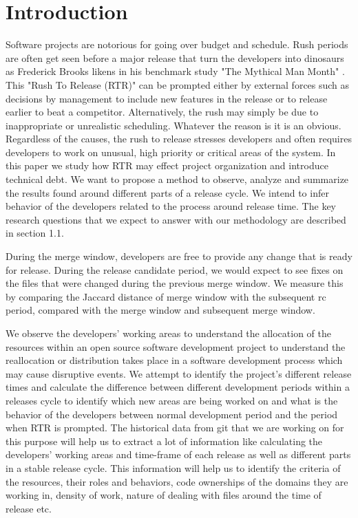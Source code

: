 \documentclass{acm_proc_article-sp}
\begin{document}
\section{Introduction}
Software projects are notorious for going over budget and schedule. Rush periods are often get seen before a major release that turn the developers into dinosaurs as Frederick Brooks likens in his benchmark study "The Mythical Man Month" \cite{brooks_mythical}. This "Rush To Release (RTR)" can be prompted either by external forces such as decisions by management to include new features in the release or to release earlier to beat a competitor. Alternatively, the rush may simply be due to inappropriate or unrealistic scheduling. Whatever the reason is it is an obvious. Regardless of the causes, the rush to release stresses developers and often requires developers to work on unusual, high priority or critical areas of the system. In this paper we study how RTR may effect project organization and introduce technical debt. We want to propose a method to observe, analyze and summarize the results found around different parts of a release cycle. We intend to infer behavior of the developers related to the process around release time. The key research questions that we expect to answer with our methodology are described in section 1.1.

During the merge window, developers are free to provide any change that is ready for release. During the release candidate period, we would expect to see fixes on the files that were changed during the previous merge window. We measure this by comparing the Jaccard distance of merge window with the subsequent rc period, compared with the merge window and subsequent merge window.

We observe the developers' working areas to understand the allocation of the resources within an open source software development project to understand the reallocation or distribution takes place in a software development process which may cause disruptive events. We attempt to identify the project's different release times and calculate the difference between different development periods within a releases cycle to identify which new areas are being worked on and what is the behavior of the developers between normal development period and the period when RTR is prompted. The historical data from git that we are working on for this purpose will help us to extract a lot of information like calculating the developers' working areas and time-frame of each release as well as different parts in a stable release cycle. This information will help us to identify the criteria of the resources, their roles and behaviors, code ownerships of the domains they are working in, density of work, nature of dealing with files around the time of release etc.
\end{document}
